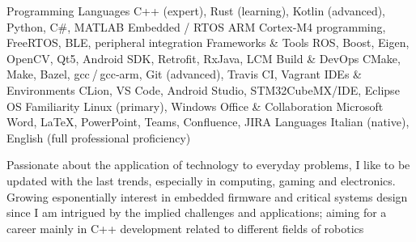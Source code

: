 \begin{cventries}

  \begin{cvskills}
    \cvskill
    {Programming Languages}
    {C++ (expert), Rust (learning), Kotlin (advanced), Python, C\#, MATLAB}
    \cvskill
    {Embedded / RTOS}
    {ARM Cortex‑M4 programming, FreeRTOS, BLE, peripheral integration}
    \cvskill
    {Frameworks \& Tools}
    {ROS, Boost, Eigen, OpenCV, Qt5, Android SDK, Retrofit, RxJava, LCM}
    \cvskill
    {Build \& DevOps}
    {CMake, Make, Bazel, gcc / gcc‑arm, Git (advanced), Travis CI, Vagrant}
    \cvskill
    {IDEs \& Environments}
    {CLion, VS Code, Android Studio, STM32CubeMX/IDE, Eclipse}
    \cvskill
    {OS Familiarity}
    {Linux (primary), Windows}
    \cvskill
    {Office \& Collaboration}
    {Microsoft Word, \LaTeX, PowerPoint, Teams, Confluence, JIRA}
    \cvskill
    {Languages}
    {Italian (native), English (full professional proficiency)}
  \end{cvskills}

\end{cventries}

\begin{cvparagraph}
  Passionate about the application of technology to everyday problems, I like to be updated with the last trends, especially in computing, gaming and electronics. Growing esponentially interest in embedded firmware and critical systems design since I am intrigued
  by the implied challenges and applications; aiming for a career mainly in C++ development related to different fields of robotics
\end{cvparagraph}

